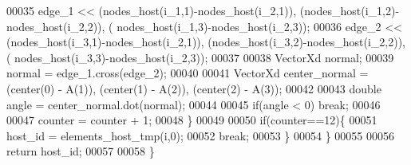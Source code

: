 \begin{DoxyCode}
00035             edge\_1 << (nodes\_host(i\_1,1)-nodes\_host(i\_2,1)), (nodes\_host(i\_1,2)-nodes\_host(i\_2,2)), (
      nodes\_host(i\_1,3)-nodes\_host(i\_2,3));
00036             edge\_2 << (nodes\_host(i\_3,1)-nodes\_host(i\_2,1)), (nodes\_host(i\_3,2)-nodes\_host(i\_2,2)), (
      nodes\_host(i\_3,3)-nodes\_host(i\_2,3)); 
00037 
00038             VectorXd normal;
00039             normal = edge\_1.cross(edge\_2);
00040 
00041             VectorXd center\_normal = (center(0) - A(1)), (center(1) - A(2)), (center(2) - A(3));
00042 
00043             \textcolor{keywordtype}{double} angle = center\_normal.dot(normal);
00044 
00045             \textcolor{keywordflow}{if}(angle < 0) \textcolor{keywordflow}{break};
00046 
00047             counter = counter + 1;
00048         \}
00049 
00050         \textcolor{keywordflow}{if}(counter==12)\{
00051             host\_id = elements\_host\_tmp(i,0);
00052             \textcolor{keywordflow}{break};
00053         \}
00054     \}
00055 
00056     \textcolor{keywordflow}{return} host\_id;
00057 
00058 \}
\end{DoxyCode}
